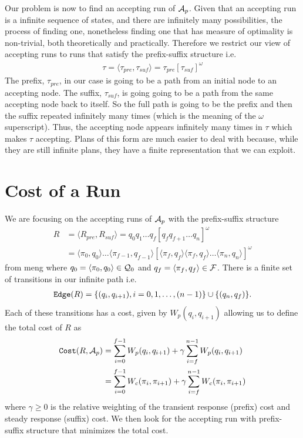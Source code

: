 Our problem is now to find an accepting run of $\mathcal{A}_p$. Given that an accepting run is a infinite sequence of states, and there are infinitely many possibilities, the process of finding one, nonetheless finding one that has measure of optimality is non-trivial, both theoretically and practically. Therefore we restrict our view of accepting runs to runs that satisfy the prefix-suffix structure i.e.\
\begin{align*}
\tau = \langle \tau_{pre}, \tau_{suf} \rangle = \tau_{pre} [\tau_{suf}]^\omega
\end{align*}
The prefix, $\tau_{pre}$, in our case is going to be a path from an initial node to an accepting node. The suffix, $\tau_{suf}$, is going going to be a path from the same accepting node back to itself. So the full path is going to be the prefix and then the suffix repeated infinitely many times (which is the meaning of the $\omega$ superscript). Thus, the accepting node appears infinitely many times in $\tau$ which makes $\tau$ accepting. Plans of this form are much easier to deal with because, while they are still infinite plans, they have a finite representation that we can exploit.

\section{Cost of a Run}
We are focusing on the accepting runs of $\mathcal{A}_p$ with the prefix-suffix structure
\begin{align*}
R &= \langle R_{pre}, R_{suf} \rangle = q_0 q_1 \dots q_f [q_f q_{f+1} \dots q_n]^\omega \\
&= \langle \pi_0, q_0 \rangle \dots \langle \pi_{f-1}, q_{f-1} \rangle [ \langle \pi_f , q_f \rangle \langle \pi_f , q_f \rangle \dots \langle \pi_{n}, q_n \rangle ]^\omega
\end{align*} 
from meng
where $q_0 = \langle \pi_0, q_0 \rangle \in \mathcal{Q}_0$ and $q_f = \langle \pi_f , q_f \rangle \in \mathcal{F}$. There is a finite set of transitions in our infinite path i.e.\ 
\begin{align*}
\texttt{Edge} (R) = \{(q_i, q_{i+1}) , i = 0,1,\dots ,(n-1)\} \cup \{(q_n , q_f ) \}.
\end{align*}
Each of these transitions has a cost, given by $W_p(q_i,q_{i+1})$ allowing us to define the total cost of $R$ as
\begin{align*}
\texttt{Cost} (R, \mathcal{A}_p) &= \sum_{i=0}^{f-1} W_p(q_i,q_{i+1}) + \gamma \sum_{i=f}^{n-1} W_p(q_i,q_{i+1}) \\
&= \sum_{i=0}^{f-1} W_c(\pi_i,\pi_{i+1}) + \gamma \sum_{i=f}^{n-1} W_c(\pi_i, \pi_{i+1})
\end{align*}
where $\gamma \geq 0$ is the relative weighting of the transient response (prefix) cost and steady response (suffix) cost. We then look for the accepting run with prefix-suffix structure that minimizes the total cost. 

